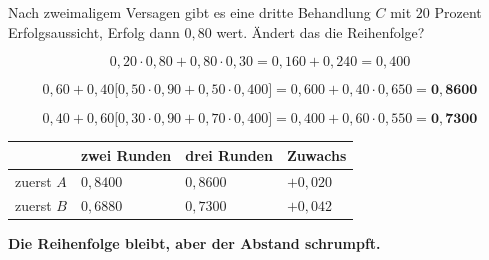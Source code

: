 \begin{aufgabe}
Nach zweimaligem Versagen gibt es eine dritte Behandlung $C$ mit $20$ Prozent Erfolgsaussicht, Erfolg dann $0{,}80$ wert. Ändert das die Reihenfolge?

\loesung
{}
\[ 0{,}20\cdot0{,}80 + 0{,}80\cdot0{,}30 = 0{,}160+0{,}240 = 0{,}400 \]

\[ 0{,}60 + 0{,}40\bigl[0{,}50\cdot0{,}90 + 0{,}50\cdot0{,}400\bigr] = 0{,}600+0{,}40\cdot0{,}650 = \mathbf{0{,}8600} \]

\[ 0{,}40 + 0{,}60\bigl[0{,}30\cdot0{,}90 + 0{,}70\cdot0{,}400\bigr] = 0{,}400+0{,}60\cdot0{,}550 = \mathbf{0{,}7300} \]

\begin{center}
{\small
\renewcommand{\arraystretch}{1.48}
\begin{tabular}{@{}P{2.4cm}P{2.2cm}P{2.2cm}P{1.8cm}@{}}
\toprule
& \textbf{zwei Runden} & \textbf{drei Runden} & \textbf{Zuwachs}\\
\midrule
zuerst $A$ & $0{,}8400$ & $0{,}8600$ & $+0{,}020$\\
zuerst $B$ & $0{,}6880$ & $0{,}7300$ & $+0{,}042$\\
\bottomrule
\end{tabular}}
\end{center}

\begin{center}
\begin{minipage}{0.9\textwidth}
\textbf{Die Reihenfolge bleibt, aber der Abstand schrumpft.}
\end{minipage}
\end{center}

\begin{center}
\begin{minipage}{0.88\textwidth}
\end{minipage}
\end{center}
\end{aufgabe}

